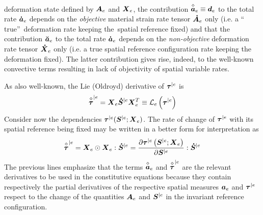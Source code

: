 \documentclass[preprint,review,12pt,sort&compress]{elsarticle}%
\renewcommand{\mathbf}[1]{\mbox{\boldmath $#1$ \unboldmath}  \!\!}
\begin{document}
deformation state defined by $\mathbf{A}_{e}$ and $\mathbf{X}_{e}$, the
contribution $\overset{\diamond}{\mathbf{a}}_{e}\equiv\mathbf{d}_{e}$ to the
total rate $\mathbf{\dot{a}}_{e}$ depends on the \emph{objective} material
strain rate tensor $\mathbf{\dot{A}}_{e}$ only (i.e. a \textquotedblleft
true\textquotedblright\ deformation rate keeping the\ spatial reference fixed)
and that the contribution $\mathbf{\breve{a}}_{e}$ to the total rate
$\mathbf{\dot{a}}_{e}$ depends on the \emph{non-objective} deformation rate
tensor $\mathbf{\dot{X}}_{e}$ only (i.e. a true spatial reference
configuration rate keeping the deformation fixed). The latter contribution
gives rise, indeed, to the well-known convective terms resulting in lack of
objectivity of spatial variable rates.

As also well-known, the Lie (Oldroyd) derivative of $\mathbf{\tau}^{|e}$ is%
\begin{equation}
\overset{\diamond}{\mathbf{\tau}}^{|e}=\mathbf{X}_{e}\mathbf{\dot{S}}%
^{|e}\mathbf{X}_{e}^{T}\equiv\mathcal{L}_{e}\left(  \mathbf{\tau}^{|e}\right)
\end{equation}
Consider now the dependencies $\mathbf{\tau}^{|e}(\mathbf{S}^{|e}%
;\mathbf{X}_{e})$. The rate of change of $\mathbf{\tau}^{|e}$ with its spatial
reference being fixed may be written in a better form for interpretation as%
\begin{equation}
\overset{\diamond}{\mathbf{\tau}}^{|e}=\mathbf{X}_{e}\odot\mathbf{X}%
_{e}:\mathbf{\dot{S}}^{|e}=\frac{\partial\mathbf{\tau}^{|e}\left(
\mathbf{S}^{|e};\mathbf{X}_{e}\right)  }{\partial\mathbf{S}^{|e}}%
:\mathbf{\dot{S}}^{|e}%
\end{equation}
The previous lines emphasize that the terms $\overset{\diamond}{\mathbf{a}%
}_{e}$ and $\overset{\diamond}{\mathbf{\tau}}^{|e}$ are the relevant
derivatives to be used in the constitutive equations because they contain
respectively the partial derivatives of the respective spatial measures
$\mathbf{a}_{e}$ and $\mathbf{\tau}^{|e}$ respect to the change of the
quantities $\mathbf{A}_{e}$ and $\mathbf{S}^{|e}$ in the invariant reference configuration.
\end{document}
